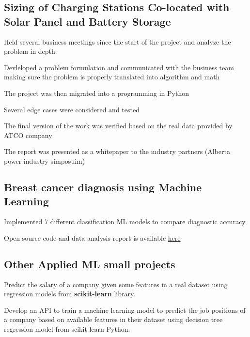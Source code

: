 \documentclass[letter,11pt]{article}
\begin{document}
	\subsection{Sizing of Charging Stations Co-located with Solar Panel and Battery Storage}
\begin{zitemize}
	\item Held several business meetings since the start of the project and analyze the problem in depth.
	\item Devleloped a problem formulation and communicated with the business team making sure the problem is properly translated into algorithm and math
	\item The project was then migrated into a programming in Python
	\item Several edge cases were considered and tested
	\item The final version of the work was verified based on the real data provided by ATCO company
	\item The report was presented as a whitepaper to the industry partners (Alberta power industry simposuim)
\end{zitemize}


\subsection{Breast cancer diagnosis using Machine Learning}
\begin{zitemize}
	\item Implemented 7 different classification ML models to compare diagnostic accuracy
	\item Open source code and data analysis report is available \href{URL}{here}
\end{zitemize}	
\subsection{Other Applied ML small projects}
\begin{zitemize}
	\item Predict the salary of a company given some features in a real dataset using regression models from \textbf{scikit-learn} library.
	\item Develop an API to train a machine learning model to predict the job positions of a company based on available features in their dataset using decision tree regression model from scikit-learn Python.
\end{zitemize}
\end{document}
